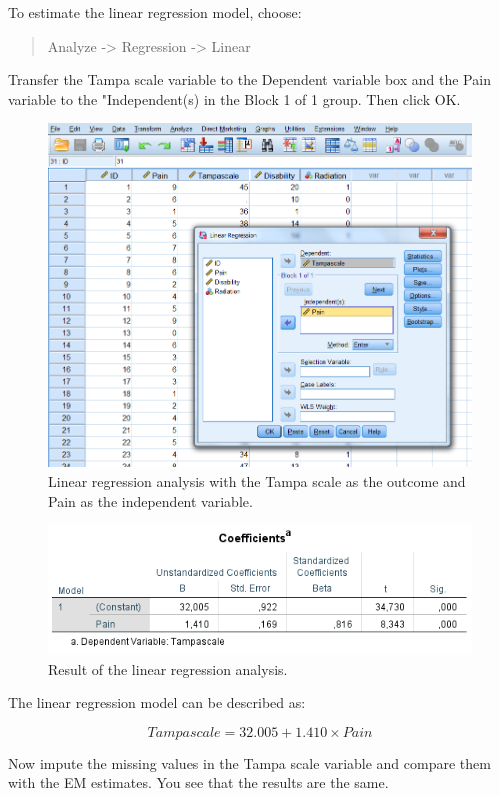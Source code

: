 \documentclass[
]{book}
\begin{document}
To estimate the linear regression model, choose:

\begin{quote}
Analyze -\textgreater{} Regression -\textgreater{} Linear
\end{quote}

Transfer the Tampa scale variable to the Dependent variable box and the Pain variable to the "Independent(s) in the Block 1 of 1 group. Then click OK.

\begin{figure}

{\centering \includegraphics[width=0.7\linewidth]{images/fig3.14} 

}

\caption{Linear regression analysis with the Tampa scale as the outcome and Pain as the independent variable.}\label{fig:fig3-14}
\end{figure}

\begin{figure}

{\centering \includegraphics[width=0.7\linewidth]{images/table3.3} 

}

\caption{Result of the linear regression analysis.}\label{fig:tab3-3}
\end{figure}

The linear regression model can be described as:

\[Tampascale = 32.005 + 1.410 × Pain\]

Now impute the missing values in the Tampa scale variable and compare them with the EM estimates. You see that the results are the same.
\end{document}
